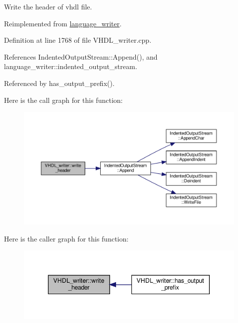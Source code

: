 Write the header of vhdl file. 



Reimplemented from \hyperlink{classlanguage__writer_a3e96d627983817f9b84f72cc1fa8bb4f}{language\+\_\+writer}.



Definition at line 1768 of file V\+H\+D\+L\+\_\+writer.\+cpp.



References Indented\+Output\+Stream\+::\+Append(), and language\+\_\+writer\+::indented\+\_\+output\+\_\+stream.



Referenced by has\+\_\+output\+\_\+prefix().

Here is the call graph for this function\+:
\nopagebreak
\begin{figure}[H]
\begin{center}
\leavevmode
\includegraphics[width=350pt]{d0/d0c/structVHDL__writer_aae8bd96734b2cf29299f86ec53cfde3c_cgraph}
\end{center}
\end{figure}
Here is the caller graph for this function\+:
\nopagebreak
\begin{figure}[H]
\begin{center}
\leavevmode
\includegraphics[width=343pt]{d0/d0c/structVHDL__writer_aae8bd96734b2cf29299f86ec53cfde3c_icgraph}
\end{center}
\end{figure}
\mbox{\label{structVHDL__writer_ad21dd69e82fa37e50df3660cd177da3c}} 
